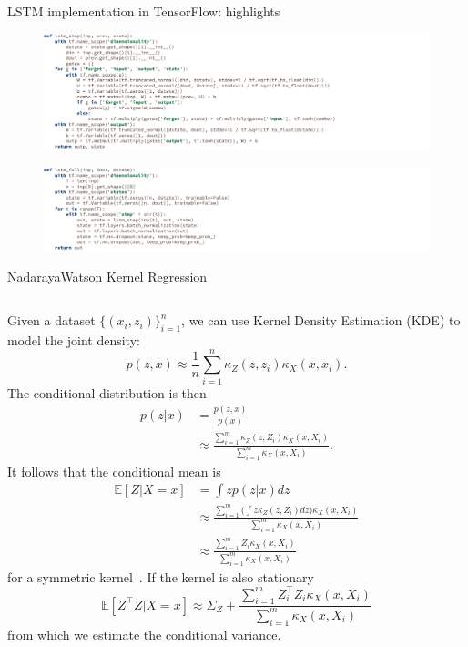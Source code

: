 \documentclass[aspectratio=169,19pt,xetex,handout]{beamer}
\begin{document}
\begin{frame}{LSTM implementation in TensorFlow: highlights}
\begin{figure}
\includegraphics[width=\textwidth]{tf_lstm_cell}
\end{figure}
\begin{figure}
\includegraphics[width=\textwidth]{tf_lstm_full}
\end{figure}
\end{frame}

\begin{frame}{Nadaraya{\textendash}Watson Kernel Regression}
\begin{columns}
Given a dataset $\{(x_i,z_i)\}_{i=1}^n$, we can use Kernel Density Estimation (KDE) to model the joint density:
\[
p(z,x) \approx \frac{1}{n} \sum_{i=1}^n \kappa_Z(z,z_i)\kappa_X(x,x_i).
\]
The conditional distribution is then
\begin{align*}
p(z|x) 
&= \frac{p(z,x)}{p(x)}  \\
&\approx \frac{\sum_{i=1}^m \kappa_Z(z,Z_i)\kappa_X(x,X_i)}{ \sum_{i=1}^m \kappa_X(x,X_i)}.
\end{align*}
It follows that the conditional mean is
\begin{align*}
 \mathbb{E}[Z|X=x] 
 &= \int z p(z|x) dz  \\
 &\approx  \frac{\sum_{i=1}^m \big(\int z \kappa_Z(z,Z_i) dz\big) \kappa_X(x,X_i)}{ \sum_{i=1}^m \kappa_X(x,X_i)}  \\
 &\approx \frac{\sum_{i=1}^m Z_i \kappa_X(x,X_i)}{ \sum_{i=1}^m \kappa_X(x,X_i)}\end{align*}
for a symmetric kernel~\cite{Nad64, Wat64}.  If the kernel is also stationary
\[
\mathbb{E}[Z^\intercal Z|X=x]\approx  \Sigma_Z + \frac{\sum_{i=1}^m Z_i^\intercal Z_i \kappa_X(x,X_i)}{ \sum_{i=1}^m \kappa_X(x,X_i)}
\]
from which we estimate the conditional variance.
 \end{columns}
\end{frame}
\end{document}
